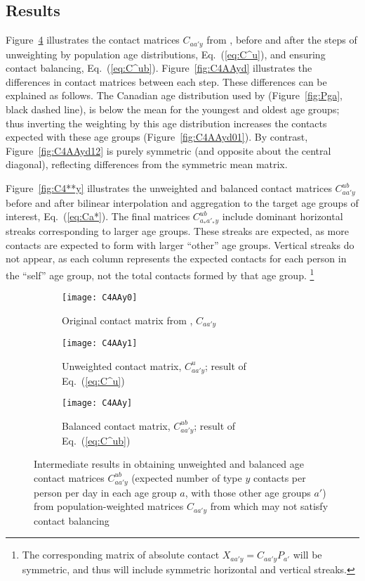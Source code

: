 \subsection{Results}\label{ex:results}
Figure~\ref{fig:C4AAyi} illustrates the contact matrices $C_{aa'y}$ from \citet{Prem2017},
before and after the steps of unweighting by population age distributions, Eq.~(\ref{eq:C^u}),
and ensuring contact balancing, Eq.~(\ref{eq:C^ub}).
Figure~\ref{fig:C4AAyd} illustrates the differences in contact matrices between each step.
These differences can be explained as follows.
The Canadian age distribution used by \citet{Prem2017} (Figure~\ref{fig:Pga}, black dashed line),
is below the mean for the youngest and oldest age groups;
thus inverting the weighting by this age distribution
increases the contacts expected with these age groups (Figure~\ref{fig:C4AAyd01}).
By contrast, Figure~\ref{fig:C4AAyd12} is purely symmetric (and opposite about the central diagonal),
reflecting differences from the symmetric mean matrix.
\par
Figure~\ref{fig:C4**y} illustrates the unweighted and balanced contact matrices $C^{ub}_{aa'y}$
before and after bilinear interpolation and aggregation to the target age groups of interest, Eq.~(\ref{eq:Ca*}).
The final matrices $C^{ub}_{a_*a'_*y}$ include dominant horizontal streaks corresponding to larger age groups.
These streaks are expected, as more contacts are expected to form with larger ``other'' age groups.
Vertical streaks do not appear, as each column represents
the expected contacts for each person in the ``self'' age group,
not the total contacts formed by that age group.%
\footnote{The corresponding matrix of absolute contact $X_{aa'y} = C_{aa'y} P_{a'}$
  will be symmetric, and thus will include symmetric horizontal and vertical streaks.}
\begin{figure}
  \setlength{\abovecaptionskip}{.5\smallskipamount}
  \setlength{\belowcaptionskip}{.5\smallskipamount}
  \begin{subfigure}{\linewidth}
    \texttt{[image: C4AAy0]}
    \caption{Original contact matrix from \cite{Prem2017}, $C_{aa'y}$}
    \label{fig:C4AAy0}
  \end{subfigure}
  \begin{subfigure}{\linewidth}
    \texttt{[image: C4AAy1]}
    \caption{Unweighted contact matrix, $C^u_{aa'y}$; result of Eq.~(\ref{eq:C^u})}
    \label{fig:C4AAy1}
  \end{subfigure}
  \begin{subfigure}{\linewidth}
    \texttt{[image: C4AAy]}
    \caption{Balanced contact matrix, $C^{ub}_{aa'y}$; result of Eq.~(\ref{eq:C^ub})}
    \label{fig:C4AAy2}
  \end{subfigure}
  \caption{Intermediate results in obtaining unweighted and balanced age contact matrices $C^{ub}_{aa'y}$
    (expected number of type $y$ contacts per person per day in each age group $a$, with those other age groups $a'$)
    from population-weighted matrices $C_{aa'y}$ from \cite{Prem2017} which may not satisfy contact balancing}
  \label{fig:C4AAyi}
\end{figure}

